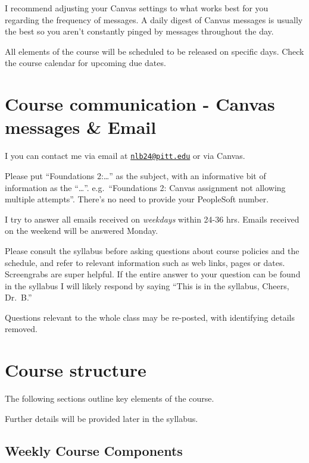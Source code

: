 \documentclass[
]{book}
\begin{document}
I recommend adjusting your Canvas settings to what works best for you regarding the frequency of messages. A daily digest of Canvas messages is usually the best so you aren't constantly pinged by messages throughout the day.

All elements of the course will be scheduled to be released on specific days. Check the course calendar for upcoming due dates.

\hypertarget{course-communication---canvas-messages-email}{%
\chapter{Course communication - Canvas messages \& Email}\label{course-communication---canvas-messages-email}}

I you can contact me via email at \href{mailto:nlb24@pitt.edu}{\nolinkurl{nlb24@pitt.edu}} or via Canvas.

Please put ``Foundations 2:\ldots{}'' as the subject, with an informative bit of information as the ``\ldots{}''. e.g.~``Foundations 2: Canvas assignment not allowing multiple attempts''. There's no need to provide your PeopleSoft number.

I try to answer all emails received on \emph{weekdays} within 24-36 hrs. Emails received on the weekend will be answered Monday.

Please consult the syllabus before asking questions about course policies and the schedule, and refer to relevant information such as web links, pages or dates. Screengrabs are super helpful. If the entire answer to your question can be found in the syllabus I will likely respond by saying ``This is in the syllabus, Cheers, Dr.~B.''

Questions relevant to the whole class may be re-posted, with identifying details removed.

\hypertarget{course-structure}{%
\chapter{Course structure}\label{course-structure}}

The following sections outline key elements of the course.

Further details will be provided later in the syllabus.

\hypertarget{weekly-course-components}{%
\section{Weekly Course Components}\label{weekly-course-components}}
\end{document}
